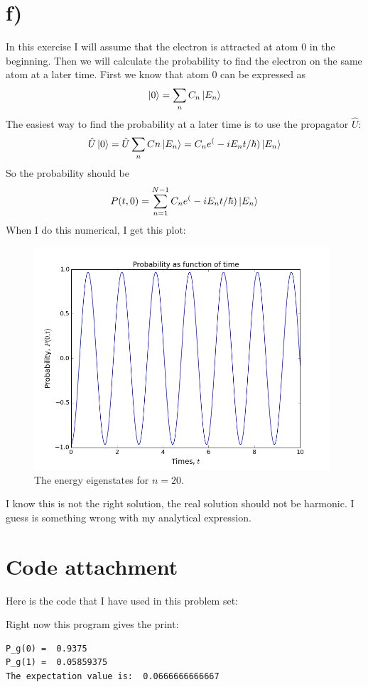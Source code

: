 \documentclass{scrartcl}
\begin{document}
\section*{f)}
In this exercise I will assume that the electron is attracted at atom 0 in the beginning. Then we will calculate the probability to find the electron on the same atom at a later time. First we know that atom 0 can be expressed as
$$\ket{0}=\sum_nC_n\ket{E_n}$$
The easiest way to find the probability at a later time is to use the propagator $\hat{U}$:
$$\hat{U}\ket{0}=\hat{U}\sum_nCn\ket{E_n}=C_ne^(-iE_nt/\hbar)\ket{E_n}$$
So the probability should be
$$P(t,0)=\sum_{n=1}^{N-1} C_ne^(-iE_nt/\hbar)\ket{E_n}$$
When I do this numerical, I get this plot:
\begin{figure}[!htbp]
\centering
\includegraphics[width=110mm]{oblig3_2.png}
\caption{The energy eigenstates for $n=20$. \label{overflow}}
\end{figure}\par\vspace{3mm}
I know this is not the right solution, the real solution should not be harmonic. I guess is something wrong with my analytical expression. 

\section*{Code attachment}
Here is the code that I have used in this problem set:

Right now this program gives the print:
\begin{lstlisting}
P_g(0) =  0.9375
P_g(1) =  0.05859375
The expectation value is:  0.0666666666667
\end{lstlisting}
\end{document}
